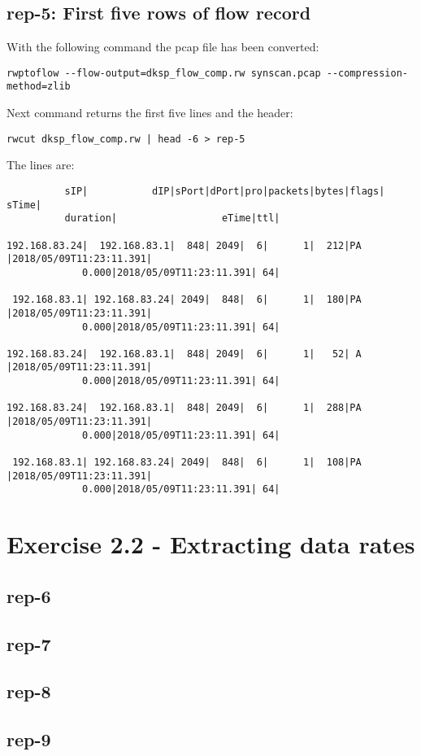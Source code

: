 \subsection*{rep-5: First five rows of flow record}
With the following command the pcap file has been converted:
\begin{verbatim}
rwptoflow --flow-output=dksp_flow_comp.rw synscan.pcap --compression-method=zlib
\end{verbatim}
Next command returns the first five lines and the header:
\begin{verbatim}
rwcut dksp_flow_comp.rw | head -6 > rep-5
\end{verbatim}
The lines are:
\begin{verbatim}
          sIP|           dIP|sPort|dPort|pro|packets|bytes|flags|                  sTime|
          duration|                  eTime|ttl|
          
192.168.83.24|  192.168.83.1|  848| 2049|  6|      1|  212|PA   |2018/05/09T11:23:11.391|
             0.000|2018/05/09T11:23:11.391| 64|
             
 192.168.83.1| 192.168.83.24| 2049|  848|  6|      1|  180|PA   |2018/05/09T11:23:11.391|
             0.000|2018/05/09T11:23:11.391| 64|
             
192.168.83.24|  192.168.83.1|  848| 2049|  6|      1|   52| A   |2018/05/09T11:23:11.391|
             0.000|2018/05/09T11:23:11.391| 64|
             
192.168.83.24|  192.168.83.1|  848| 2049|  6|      1|  288|PA   |2018/05/09T11:23:11.391|
             0.000|2018/05/09T11:23:11.391| 64|
             
 192.168.83.1| 192.168.83.24| 2049|  848|  6|      1|  108|PA   |2018/05/09T11:23:11.391|
             0.000|2018/05/09T11:23:11.391| 64|
\end{verbatim}

\section*{Exercise 2.2 - Extracting data rates}
\subsection*{rep-6}
\subsection*{rep-7}
\subsection*{rep-8}
\subsection*{rep-9}